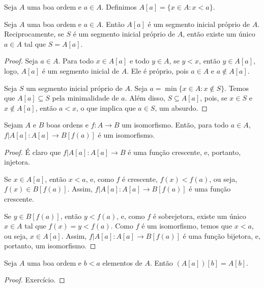\begin{definition}[$\BST$]\label{def:segmentoInicialDeterminadoPorElemento}
    Seja $A$ uma boa ordem e $a\in A$.
    Definimos $A[a] = \{x\in A : x<a\}$.
\end{definition}
\begin{lemma}[$\BST$]\label{lem:segmentosIniciaisPropriosSaoDeterminadosPorElementos}
    Seja $A$ uma boa ordem e $a\in A$.
    Então $A[a]$ é um segmento inicial próprio de $A$.
    Reciprocamente, se $S$ é um segmento inicial próprio de $A$, então existe um único $a\in A$ tal que $S=A[a]$.
\end{lemma}
\begin{proof}
    Seja $a\in A$.
    Para todo $x\in A[a]$ e todo $y\in A$, se $y<x$, então $y\in A[a]$, logo, $A[a]$ é um segmento inicial de $A$.
    Ele é próprio, pois $a\in A$ e $a\notin A[a]$.

    Seja $S$ um segmento inicial próprio de $A$.
    Seja $a=\min\{x\in A : x\notin S\}$.
    Temos que $A[a]\subseteq S$ pela minimalidade de $a$.
    Além disso, $S\subseteq A[a]$, pois, se $x\in S$ e $x\notin A[a]$, então $a<x$, o que implica que $a\in S$, um absurdo.
\end{proof}

\begin{lemma}[$\BST$]\label{lem:isomorfismoPreservaSegmentosIniciais}
    Sejam $A$ e $B$ boas ordens e $f:A\to B$ um isomorfismo.
    Então, para todo $a\in A$, $f|A[a]: A[a]\to B[f(a)]$ é um isomorfismo.
\end{lemma}
\begin{proof}
    É claro que $f|A[a]: A[a]\to B$ é uma função crescente, e, portanto, injetora.

    Se $x\in A[a]$, então $x<a$, e, como $f$ é crescente, $f(x)<f(a)$, ou seja, $f(x)\in B[f(a)]$.
    Assim, $f|A[a]: A[a]\to B[f(a)]$ é uma função crescente.

    Se $y \in B[f(a)]$, então $y<f(a)$, e, como $f$ é sobrejetora, existe um único $x\in A$ tal que $f(x)=y<f(a)$.
    Como $f$ é um isomorfismo, temos que $x<a$, ou seja, $x\in A[a]$.
    Assim, $f|A[a]: A[a]\to B[f(a)]$ é uma função bijetora, e, portanto, um isomorfismo.
\end{proof}

\begin{lemma}[$\BST$]\label{lem:segmentosIniciaisDeSegmentosIniciais}
    Seja $A$ uma boa ordem e $b<a$ elementos de $A$.
    Então $(A[a])[b]=A[b]$.
\end{lemma}
\begin{proof}
    Exercício.
\end{proof}

